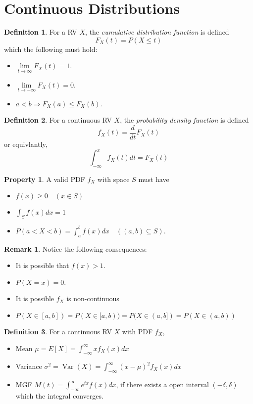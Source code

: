\documentclass[12pt,a4paper,twoside]{article}
\theoremstyle{definition}
\newtheorem{definition}{Definition}[section]
\newtheorem{property}{Property}[section]
\newtheorem*{remark}{Remark}
\theoremstyle{remark}
\DeclareMathOperator{\Var}{Var}
\begin{document}
    \section{Continuous Distributions}
    \begin{definition}%
        For a RV $X$, the \textit{cumulative distribution function} is defined
        \[ F_X(t) = P(X \leq t) \]
        which the following must hold:
        \begin{itemize}
            \item $\lim\limits_{t\rightarrow\infty} F_X(t) = 1$.
            \item $\lim\limits_{t\rightarrow-\infty} F_X(t) = 0$.
            \item $a < b \Rightarrow F_X(a) \leq F_X(b)$.
        \end{itemize}
    \end{definition}
    \begin{definition}%
        For a continuous RV $X$, the \textit{probability density function} is defined
        \[ f_X(t) = \frac{d}{dt} F_X(t) \]
        or equivlantly,
        \[ \int_{-\infty}^x f_X(t) dt = F_X(t) \]
    \end{definition}
    \begin{property}
        A valid PDF $f_X$ with space $S$ must have
        \begin{itemize}
            \item $f(x) \geq 0 \quad (x \in S)$
            \item $\int_S f(x) dx = 1$
            \item $P(a < X < b) = \int_a^b f(x) dx \quad ((a, b) \subseteq S)$.
        \end{itemize}
    \end{property}
    \begin{remark}
        Notice the following consequences:
        \begin{itemize}
            \item It is possible that $f(x) > 1$.
            \item $P(X = x) = 0$.
            \item It is possible $f_X$ is non-continuous
            \item $P(X \in [a, b]) = P(X \in [a, b)) = P(X \in (a, b]) = P(X \in (a, b))$
        \end{itemize}
    \end{remark}
    \begin{definition}%
        For a continuous RV $X$ with PDF $f_X$,
        \begin{itemize}
            \item Mean $\mu = E[X] = \int_{-\infty}^{\infty} x f_X(x) dx$
            \item Variance $\sigma^2 = \Var(X) = \int_{-\infty}^{\infty} (x - \mu)^2 f_X(x) dx$
            \item MGF $M(t) = \int_{-\infty}^{\infty} e^{tx} f(x) dx$, if there exists a open interval $(-\delta, \delta)$ which the integral converges.
        \end{itemize}
    \end{definition}
\end{document}
